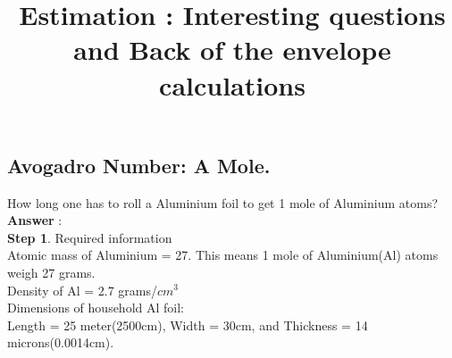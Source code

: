 \documentclass[11pt]{exam}
\begin{document}
\title{\textbf{Estimation : Interesting questions and Back of the envelope calculations}}
\maketitle

\subsection{Avogadro Number: A Mole.}

\begin{questions}

\question
\label{Q1:Al Foil}

How long one has to roll a Aluminium foil to get 1 mole of Aluminium atoms?\\
\textbf{Answer }: \\
\textbf{Step 1}. Required information\\ 

			     Atomic mass of Aluminium = 27. This means 1 mole of    Aluminium(Al) atoms weigh 27 grams.\\
			     Density of Al = 2.7 grams/$cm^{3}$\\
			     Dimensions of household Al foil:\\ Length = 25 meter(2500cm), Width = 30cm, and Thickness = 14 microns(0.0014cm).\\ 
		                                    
\end{questions}
\end{document}
